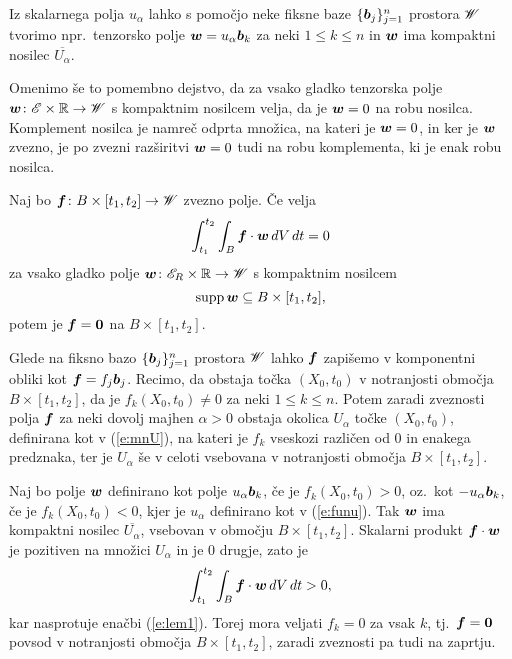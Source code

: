 Iz skalarnega polja $u_{\alpha}$ lahko s pomočjo neke fiksne baze $\{\boldsymbol b_j\}_{j=1}^{n}$
prostora $\mathscr W$ tvorimo npr.~tenzorsko polje $\boldsymbol w=u_{\alpha}\boldsymbol b_k$ za neki $1\leq k\leq n$
in $\boldsymbol w$ ima kompaktni nosilec $\overline{U_{\alpha}}$.

Omenimo še to pomembno dejstvo, da za vsako gladko tenzorska polje $\boldsymbol w\colon\mathscr E\times\mathbb R\to\mathscr W$ s kompaktnim
nosilcem velja, da je $\boldsymbol w={0}$ na robu nosilca. Komplement nosilca je namreč odprta množica, na kateri
je $\boldsymbol w={0}$, in ker je $\boldsymbol w$ zvezno, je po zvezni razširitvi $\boldsymbol w={0}$ tudi na robu komplementa,
ki je enak robu nosilca.

\begin{lema}\label{l:1}
	Naj bo $\boldsymbol f\colon B\times [t_1,t_2]\to\mathscr W$ zvezno polje. Če velja
	\begin{equation}\label{e:lem1}
		\int_{t_1}^{t_2}\int_B\boldsymbol f\cdot\boldsymbol w\,dV\,dt = 0
	\end{equation}
	za vsako gladko polje $\boldsymbol w\colon\mathscr E_R\times\mathbb R\to\mathscr W$ s kompaktnim nosilcem
	\[ \mathrm{supp}\, \boldsymbol w\subseteq B\times[t_1,t_2], \]
	potem je $\boldsymbol f=\boldsymbol 0$ na $B\times [t_1,t_2]$.
\end{lema}

\proof
	Glede na fiksno bazo $\{\boldsymbol b_j\}_{j=1}^n$ prostora $\mathscr W$ lahko $\boldsymbol f$
	zapišemo v komponentni obliki kot $\boldsymbol f=f_j\boldsymbol b_j$.
	Recimo, da obstaja točka $(X_0,t_0)$ v notranjosti območja $B\times[t_1,t_2]$, da je $f_{k}(X_0,t_0)\neq 0$
	za neki $1\leq k\leq n$. Potem zaradi zveznosti polja $\boldsymbol f$ za neki dovolj majhen
	$\alpha > 0$ obstaja okolica $U_{\alpha}$ točke $(X_0,t_0)$, definirana kot v (\ref{e:mnU}), na kateri je $f_k$
	vseskozi različen od 0 in enakega predznaka, ter
	je $U_{\alpha}$ še v celoti vsebovana v notranjosti območja $B\times[t_1,t_2]$.
	
	Naj bo polje
	$\boldsymbol w$ definirano kot polje $u_{\alpha}\boldsymbol b_k$, če je $f_{k}(X_0,t_0) > 0$, oz.~kot $-u_{\alpha}\boldsymbol b_k$,
	če je $f_{k}(X_0,t_0) < 0$, kjer je $u_{\alpha}$ definirano kot v (\ref{e:funu}). Tak $\boldsymbol w$ ima
	kompaktni nosilec $\overline{U_{\alpha}}$, vsebovan v območju $B\times[t_1,t_2]$.
	Skalarni produkt $\boldsymbol f\cdot\boldsymbol w$ je pozitiven na množici $U_{\alpha}$ in je 0 drugje, zato je
	\[ \int_{t_1}^{t_2}\int_B \boldsymbol f\cdot \boldsymbol w\,dV\,dt > 0, \]
	kar nasprotuje enačbi (\ref{e:lem1}). Torej mora veljati $f_k=0$ za vsak $k$,
	tj.~$\boldsymbol f=\boldsymbol 0$ povsod v notranjosti območja $B\times [t_1,t_2]$,
	zaradi zveznosti pa tudi na zaprtju.
\endproof

